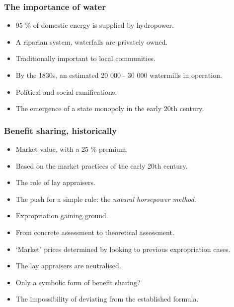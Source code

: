 \documentclass{beamer}
\begin{document}
\begin{frame}
\frametitle{The importance of water}
\begin{itemize}
\item 95 \% of domestic energy is supplied by hydropower.
\item A riparian system, waterfalls are privately owned.
\item Traditionally important to local communities.
\item By the 1830s, an estimated 20 000 - 30 000 watermills in operation.
\item Political and social ramifications.  
\item The emergence of a state monopoly in the early 20th century.
\end{itemize}
\end{frame}

\begin{frame}
\frametitle{Benefit sharing, historically}
\begin{itemize}
\item Market value, with a 25 \% premium.
\item Based on the market practices of the early 20th century.
\item The role of lay appraisers.
\item The push for a simple rule: the {\it natural horsepower method}.
\item Expropriation gaining ground.
\end{itemize}
\end{frame}

\begin{frame}
\begin{itemize}
\item From concrete assessment to theoretical assessment.
\item `Market' prices determined by looking to previous expropriation cases.
\item The lay appraisers are neutralised.
\item Only a symbolic form of benefit sharing?
\item The impossibility of deviating from the established formula.
\end{itemize}
\end{frame}
\end{document}
